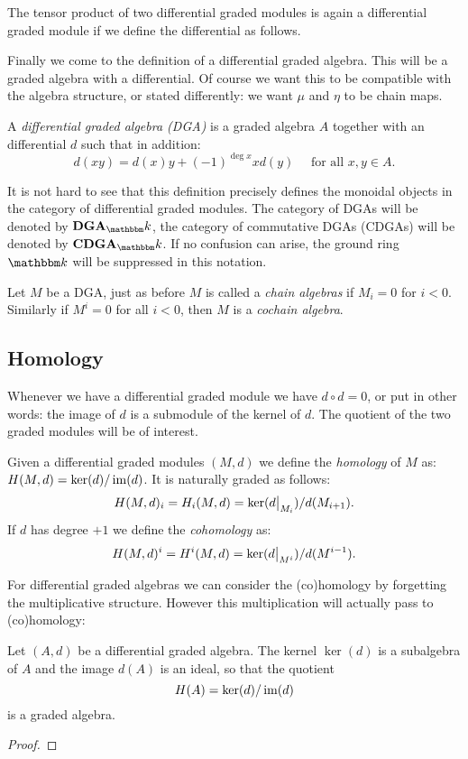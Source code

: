 The tensor product of two differential graded modules is again a differential graded module if we define the differential as follows. 

Finally we come to the definition of a differential graded algebra. This will be a graded algebra with a differential. Of course we want this to be compatible with the algebra structure, or stated differently: we want $\mu$ and $\eta$ to be chain maps.

\begin{definition}
	A \emph{differential graded algebra (DGA)} is a graded algebra $A$ together with an differential $d$ such that in addition:
	$$ d(xy) = d(x) y + (-1)^{\deg{x}} x d(y) \quad\text{ for all } x, y \in A. $$
\end{definition}

It is not hard to see that this definition precisely defines the monoidal objects in the category of differential graded modules. The category of DGAs will be denoted by $\DGA_\k$, the category of commutative DGAs (CDGAs) will be denoted by $\CDGA_\k$. If no confusion can arise, the ground ring $\k$ will be suppressed in this notation.

Let $M$ be a DGA, just as before $M$ is called a \emph{chain algebras} if $M_i = 0$ for $i < 0$. Similarly if $M^i = 0$ for all $i < 0$, then $M$ is a \emph{cochain algebra}.


\subsection{Homology}

Whenever we have a differential graded module we have $d \circ d = 0$, or put in other words: the image of $d$ is a submodule of the kernel of $d$. The quotient of the two graded modules will be of interest.

\begin{definition}
	Given a differential graded modules $(M, d)$ we define the \emph{homology} of $M$ as: $H(M, d) = \ker(d) / \operatorname*{im}(d)$.
	It is naturally graded as follows:
	$$ H(M, d)_i = H_i(M, d) = \ker(\restr{d}{M_i}) / d(M_{i+1}). $$
	If $d$ has degree $+1$ we define the \emph{cohomology} as:
	$$ H(M, d)^i = H^i(M, d) = \ker(\restr{d}{M^i}) / d(M^{i-1}). $$
\end{definition}

For differential graded algebras we can consider the (co)homology by forgetting the multiplicative structure. However this multiplication will actually pass to (co)homology:

\begin{lemma}
	Let $(A, d)$ be a differential graded algebra. The kernel $\ker(d)$ is a subalgebra of $A$ and the image $d(A)$ is an ideal, so that the quotient
	$$ H(A) = \ker(d) / \operatorname*{im}(d) $$
	is a graded algebra.
\end{lemma}
\begin{proof}
	\todo{}
\end{proof}

